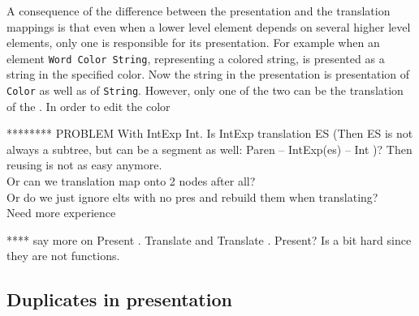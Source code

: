 A consequence of the difference between the presentation and the translation mappings is that even when a lower level element depends on several higher level elements, only one is responsible for its presentation. For example when an element \verb|Word Color String|, representing a colored string, is presented as a string in the specified color. Now the string in the presentation is presentation of \verb|Color| as well as of \verb|String|. However, only one of the two can be the translation of the . In order to edit the color


   

******** PROBLEM With IntExp  Int. 
Is IntExp translation ES (Then ES is not always a subtree, but can be a segment as well: Paren -- IntExp(es) -- Int )? Then reusing is not as easy anymore.\\
Or can we translation map onto 2 nodes after all?\\
Or do we just ignore elts with no pres and rebuild them when translating?\\
Need more experience



**** say more on Present . Translate and Translate . Present? Is a bit hard since they are not functions.

\fromHere  %

%
%





%																
\subsection{Duplicates in presentation}

